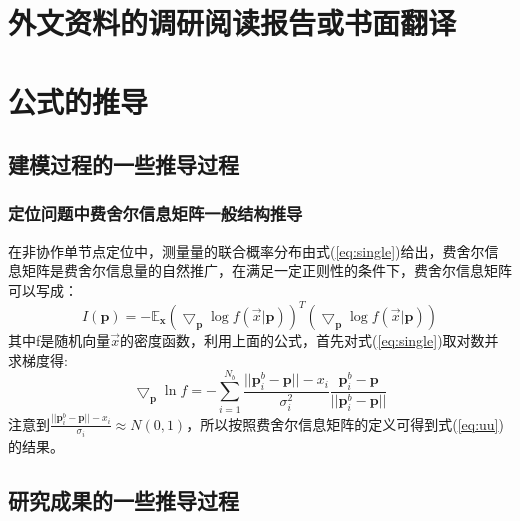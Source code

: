 \chapter{外文资料的调研阅读报告或书面翻译}

\chapter{公式的推导}
\section{建模过程的一些推导过程}
\subsection{定位问题中费舍尔信息矩阵一般结构推导}\label{A_F_1}
在非协作单节点定位中，测量量的联合概率分布由式(\ref{eq:single})给出，费舍尔信息矩阵是费舍尔信息量的自然推广，在满足一定正则性的条件下，费舍尔信息矩阵可以写成：
\begin{equation}
I(\bm{p})=-\mathbb{E}_{\bm{x}}(\bigtriangledown_{\bm{p}} \log f(\vec{x}|\bm{p}))^T(\bigtriangledown_{\bm{p}} \log f(\vec{x}|\bm{p}))
\end{equation}
其中f是随机向量$\vec{x}$的密度函数，利用上面的公式，首先对式(\ref{eq:single})取对数并求梯度得:
\begin{equation}
\bigtriangledown_{\bm{p}}\ln f=-\sum_{i=1}^{N_b}\frac{||\bm{p}_i^b-\bm{p}||-x_i}{\sigma_i^2}\frac{\bm{p}^b_i-\bm{p}}{||\bm{p}^b_i-\bm{p}||}
\end{equation}
注意到$\frac{||\bm{p}_i^b-\bm{p}||-x_i}{\sigma_i}\approx N(0,1)$，所以按照费舍尔信息矩阵的定义可得到式(\ref{eq:uu})的结果。
\section{研究成果的一些推导过程}
